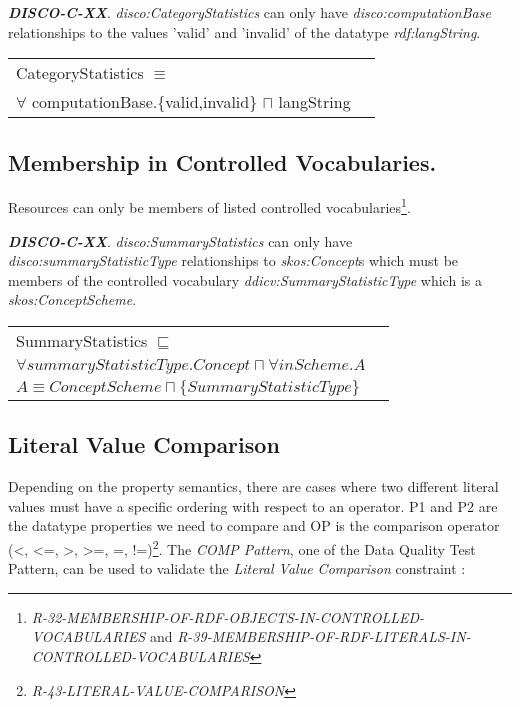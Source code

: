 \documentclass{elsart3p}    %
\newenvironment{DL}{
  \vspace{0cm}
  \begin{tabular}{l l}

}{
  \end{tabular}
}
\begin{document}
\textbf{{\em DISCO-C-XX}}.
{\em disco:CategoryStatistics} can only have {\em disco:computationBase} relationships to the values 'valid' and 'invalid' of the datatype {\em rdf:langString}.

\begin{DL}
CategoryStatistics $\equiv$ \\ $\forall$ computationBase.\{valid,invalid\} $\sqcap$ langString \\
\end{DL}

\subsection{Membership in Controlled Vocabularies.}

Resources can only be members of listed controlled vocabularies\footnote{{\em R-32-MEMBERSHIP-OF-RDF-OBJECTS-IN-CONTROLLED-VOCABULARIES} and
{\em R-39-MEMBERSHIP-OF-RDF-LITERALS-IN-CONTROLLED-VOCABULARIES}}.

\textbf{{\em DISCO-C-XX}}.
{\em disco:SummaryStatistics} can only have {\em disco:summaryStatisticType} relationships to {\em skos:Concept}s which must be members of the controlled vocabulary {\em ddicv:SummaryStatisticType} which is a {\em skos:ConceptScheme}.

\begin{DL}
SummaryStatistics $\sqsubseteq$ \\
$\forall summaryStatisticType.Concept \sqcap \forall inScheme . A$ \\
$A \equiv ConceptScheme \sqcap \{SummaryStatisticType\}$
\end{DL}

\subsection{Literal Value Comparison}

Depending on the property semantics,
there are cases where two different literal values must have
a specific ordering with respect to an operator. 
P1 and P2 are the datatype properties we need to compare and 
OP is the comparison operator (\textless, \textless=, \textgreater, \textgreater=, =, !=)\footnote{{\em R-43-LITERAL-VALUE-COMPARISON}}.
The {\em COMP Pattern}, one of the Data Quality Test Pattern, can be used to validate the {\em Literal Value Comparison} constraint \cite{Kontokostas2014}:

\end{document}
